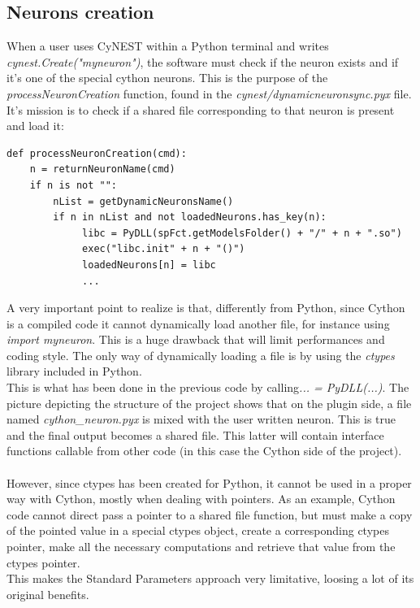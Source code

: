 \documentclass{article}
\begin{document}
\subsection{Neurons creation}
When a user uses CyNEST within a Python terminal and writes \emph{cynest.Create("myneuron")}, the software must check if the neuron exists and if it's one of the special cython neurons. This is the purpose of the \emph{processNeuronCreation} function, found in the \emph{cynest/dynamicneuronsync.pyx} file. It's mission is to check if a shared file corresponding to that neuron is present and load it:
\begin{verbatim}
def processNeuronCreation(cmd):
    n = returnNeuronName(cmd)
    if n is not "":
        nList = getDynamicNeuronsName()
        if n in nList and not loadedNeurons.has_key(n):
             libc = PyDLL(spFct.getModelsFolder() + "/" + n + ".so")
             exec("libc.init" + n + "()")
             loadedNeurons[n] = libc
             ...
\end{verbatim}
A very important point to realize is that, differently from Python, since Cython is a compiled code it cannot dynamically load another file, for instance using \emph{import myneuron}. This is a huge drawback that will limit performances and coding style. The only way of dynamically loading a file is by using the \emph{ctypes} library included in Python.\\
This is what has been done in the previous code by calling\emph{... = PyDLL(...)}. The picture depicting the structure of the project shows that on the plugin side, a file named \emph{cython\_neuron.pyx} is mixed with the user written neuron. This is true and the final output becomes a shared file. This latter will contain interface functions callable from other code (in this case the Cython side of the project).\\ \\
However, since ctypes has been created for Python, it cannot be used in a proper way with Cython, mostly when dealing with pointers. As an example, Cython code cannot direct pass a pointer to a shared file function, but must make a copy of the pointed value in a special ctypes object, create a corresponding ctypes pointer, make all the necessary computations and retrieve that value from the ctypes pointer.\\ 
This makes the Standard Parameters approach very limitative, loosing a lot of its original benefits.
\end{document}
